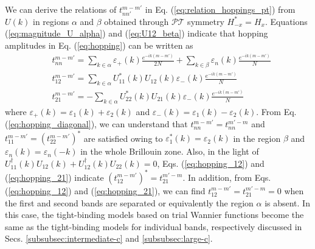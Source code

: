 \documentclass[prb,superscriptaddress,floatfix,twocolumn,showpacs]{revtex4-2}
\begin{document}
We can derive the relations of $t_{nn'}^{m-m'}$ in Eq. (\ref{eq:relation_hoppings_pt})  from $U(k)$ in regions $\alpha$ and $\beta$ obtained through $\mathcal{PT}$ symmetry $H_{-x}^\ast=H_x$. 
Equations (\ref{eq:magnitude_U_alpha}) and (\ref{eq:U12_beta}) indicate that hopping amplitudes in Eq. (\ref{eq:hopping}) can be written as
\begin{align}
    &t_{nn}^{m-m'}=\sum_{k\in\alpha}\varepsilon_+(k)
    \frac{e^{-ik(m-m')}}{2N}+\sum_{k\in\beta}\varepsilon_n(k)\frac{e^{-ik(m-m')}}{N}
    \label{eq:hopping_diagonal}\\
    &t_{12}^{m-m'}=\sum_{k\in\alpha}U_{11}^\ast(k)U_{12}(k)
    \varepsilon_-(k)\frac{e^{-ik(m-m')}}{N}
    \label{eq:hopping_12}\\
    &t_{21}^{m-m'}=-\sum_{k\in\alpha}U_{22}^\ast(k)U_{21}(k)
    \varepsilon_-(k)\frac{e^{-ik(m-m')}}{N}
    \label{eq:hopping_21}
\end{align}
where $\varepsilon_+(k)=\varepsilon_1(k)+\varepsilon_2(k)$ and $\varepsilon_-(k)=\varepsilon_1(k)-\varepsilon_2(k)$. 
From Eq. (\ref{eq:hopping_diagonal}), we can understand that $t_{nn}^{m-m'}=t_{nn}^{m'-m}$ and $t_{11}^{m-m'}=(t_{22}^{m-m'})^\ast$ are satisfied owing to $\varepsilon_1^\ast(k)=\varepsilon_2(k)$ in the region $\beta$ and $\varepsilon_n(k)=\varepsilon_n(-k)$ in the whole Brillouin zone. 
Also, in the light of $U^\dagger_{11}(k)U_{12}(k)+U^\dagger_{12}(k)U_{22}(k)=0$, Eqs. (\ref{eq:hopping_12}) and (\ref{eq:hopping_21}) indicate $(t_{12}^{m-m'})^\ast=t_{21}^{m'-m}$. 
In addition, from Eqs. (\ref{eq:hopping_12}) and (\ref{eq:hopping_21}), we can find 
$t_{12}^{m-m'}=t_{21}^{m'-m}=0$ when the first and second bands are separated or equivalently the region $\alpha$ is absent. 
In this case, the tight-binding models based on trial Wannier functions become the same as the tight-binding models for individual bands, respectively discussed in Secs. \ref{subsubsec:intermediate-c} and \ref{subsubsec:large-c}.
\end{document}
